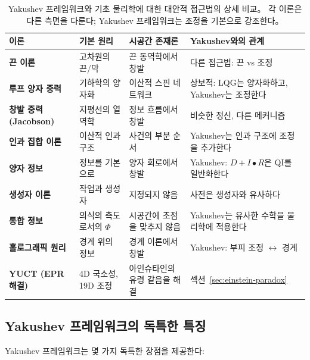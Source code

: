 \documentclass[11pt,a4paper]{article}
\begin{document}
\begin{table}[htbp]
\centering
\scriptsize
\begin{tabular}{p{}p{}p{}p{}}
	\toprule
	\textbf{이론} & \textbf{기본 원리} & \textbf{시공간 존재론} & \textbf{Yakushev와의 관계} \\
	\midrule
	\textbf{끈 이론} & 
	고차원의 끈/막 & 
	끈 동역학에서 창발 & 
	다른 접근법: 끈 vs 조정 \\
	\hline
	\textbf{루프 양자 중력} & 
	기하학의 양자화 & 
	이산적 스핀 네트워크 & 
	상보적: LQG는 양자화하고, Yakushev는 조정한다 \\
	\hline
	\textbf{창발 중력 (Jacobson)} & 
	지평선의 열역학 & 
	정보 흐름에서 창발 & 
	비슷한 정신, 다른 메커니즘 \\
	\hline
	\textbf{인과 집합 이론} & 
	이산적 인과 구조 & 
	사건의 부분 순서 & 
	Yakushev는 인과 구조에 조정을 추가한다 \\
	\hline
	\textbf{양자 정보} & 
	정보를 기본으로 & 
	양자 회로에서 창발 & 
	Yakushev: $D+I•R$은 QI를 일반화한다 \\
	\hline
	\textbf{생성자 이론} & 
	작업과 생성자 & 
	지정되지 않음 & 
	사전은 생성자와 유사하다 \\
	\hline
	\textbf{통합 정보} & 
	의식의 측도로서의 $\Phi$ & 
	시공간에 초점을 맞추지 않음 & 
	Yakushev는 유사한 수학을 물리학에 적용한다 \\
	\hline
	\textbf{홀로그래픽 원리} & 
	경계 위의 정보 & 
	경계 이론에서 창발 & 
	Yakushev: 부피 조정 $\leftrightarrow$ 경계 \\
	\hline
	\textbf{YUCT (EPR 해결)} & 
	4D 국소성, 19D 조정 & 
	아인슈타인의 유령 같음을 해결 & 
	섹션~\ref{sec:einstein-paradox} \\
	\bottomrule
\end{tabular}
\caption{Yakushev 프레임워크와 기초 물리학에 대한 대안적 접근법의 상세 비교。 각 이론은 다른 측면을 다룬다; Yakushev 프레임워크는 조정을 기본으로 강조한다。}
\end{table}

\subsection{Yakushev 프레임워크의 독특한 특징}

Yakushev 프레임워크는 몇 가지 독특한 장점을 제공한다:
\end{document}
